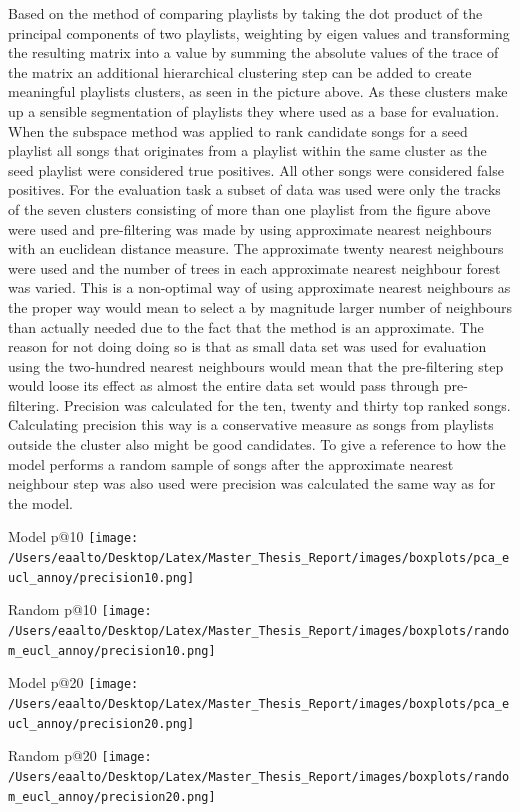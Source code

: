 \documentclass[a4paper,11pt]{kth-mag}
\begin{document}
Based on the method of comparing playlists by taking the dot product of the principal components of two playlists, weighting by eigen values and transforming the resulting matrix into a value by summing the absolute values of the trace of the matrix an additional hierarchical clustering step can be added to create meaningful playlists clusters, as seen in the picture above. As these clusters make up a sensible segmentation of playlists they where used as a base for evaluation. When the subspace method was applied to rank candidate songs for a seed playlist all songs that originates from a playlist within the same cluster as the seed playlist were considered true positives. All other songs were considered false positives. For the evaluation task a subset of data was used were only the tracks of the seven clusters consisting of more than one playlist from the figure above were used and pre-filtering was made by using approximate nearest neighbours with an euclidean distance measure. The approximate twenty nearest neighbours were used and the number of trees in each approximate nearest neighbour forest was varied. This is a non-optimal way of using approximate nearest neighbours as the proper way would mean to select a by magnitude larger number of neighbours than actually needed due to the fact that the method is an approximate. The reason for not doing doing so is that as small data set was used for evaluation using the two-hundred nearest neighbours would mean that the pre-filtering step would loose its effect as almost the entire data set would pass through pre-filtering. 
Precision was calculated for the ten, twenty and thirty top ranked songs. Calculating precision this way is a conservative measure as songs from playlists outside the cluster also might be good candidates. 
To give a reference to how the model performs a random sample of songs after the approximate nearest neighbour step was also used were precision was calculated the same way as for the model.

Model p@10
\texttt{[image: /Users/eaalto/Desktop/Latex/Master\_Thesis\_Report/images/boxplots/pca\_eucl\_annoy/precision10.png]}

Random p@10
\texttt{[image: /Users/eaalto/Desktop/Latex/Master\_Thesis\_Report/images/boxplots/random\_eucl\_annoy/precision10.png]}

Model p@20
\texttt{[image: /Users/eaalto/Desktop/Latex/Master\_Thesis\_Report/images/boxplots/pca\_eucl\_annoy/precision20.png]}

Random p@20
\texttt{[image: /Users/eaalto/Desktop/Latex/Master\_Thesis\_Report/images/boxplots/random\_eucl\_annoy/precision20.png]}
\end{document}
